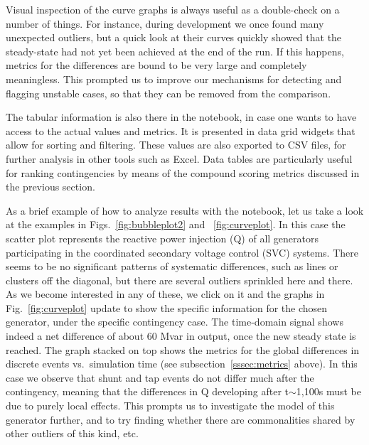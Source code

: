 \documentclass[conference]{IEEEtran}
\begin{document}
Visual inspection of the curve graphs is always useful as a
double-check on a number of things. For instance, during development
we once found many unexpected outliers, but a quick look at their
curves quickly showed that the steady-state had not yet been achieved
at the end of the run. If this happens, metrics for the differences
are bound to be very large and completely meaningless.  This prompted
us to improve our mechanisms for detecting and flagging unstable
cases, so that they can be removed from the comparison.

The tabular information is also there in the notebook, in case one
wants to have access to the actual values and metrics. It is presented
in data grid widgets that allow for sorting and filtering.  These
values are also exported to CSV files, for further analysis in other
tools such as Excel.  Data tables are particularly useful for ranking
contingencies by means of the compound scoring metrics discussed in
the previous section.

As a brief example of how to analyze results with the notebook, let us
take a look at the examples in Figs.~\ref{fig:bubbleplot2} and
~\ref{fig:curveplot}. In this case the scatter plot represents the
reactive power injection (Q) of all generators participating in the
coordinated secondary voltage control (SVC) systems. There seems to be
no significant patterns of systematic differences, such as lines or
clusters off the diagonal, but there are several outliers sprinkled
here and there.  As we become interested in any of these, we click on
it and the graphs in Fig.~\ref{fig:curveplot} update to show the
specific information for the chosen generator, under the specific
contingency case. The time-domain signal shows indeed a net difference
of about 60 Mvar in output, once the new steady state is reached. The
graph stacked on top shows the metrics for the global differences in
discrete events vs.~simulation time (see subsection~\ref{sssec:metrics}
above).  In this case we observe that shunt and tap events do not
differ much after the contingency, meaning that the differences in Q
developing after t$\sim$1,100s must be due to purely local effects. This
prompts us to investigate the model of this generator further, and to
try finding whether there are commonalities shared by other outliers of
this kind, etc.
\end{document}
